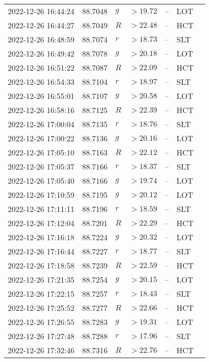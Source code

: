 \documentclass{nature_plusfigure}
\begin{document}
\begin{supplement}
\begin{center}
\begin{longtable}{lllllll}
2022-12-26 16:44:24 & 88.7048 & $g$ & $>19.72$ & -- & LOT &  \\ 
2022-12-26 16:44:27 & 88.7049 & $R$ & $>22.48$ & -- & HCT &  \\ 
2022-12-26 16:48:59 & 88.7074 & $r$ & $>18.73$ & -- & SLT &  \\ 
2022-12-26 16:49:42 & 88.7078 & $g$ & $>20.18$ & -- & LOT &  \\ 
2022-12-26 16:51:22 & 88.7087 & $R$ & $>22.09$ & -- & HCT &  \\ 
2022-12-26 16:54:33 & 88.7104 & $r$ & $>18.97$ & -- & SLT &  \\ 
2022-12-26 16:55:01 & 88.7107 & $g$ & $>20.58$ & -- & LOT &  \\ 
2022-12-26 16:58:16 & 88.7125 & $R$ & $>22.39$ & -- & HCT &  \\ 
2022-12-26 17:00:04 & 88.7135 & $r$ & $>18.76$ & -- & SLT &  \\ 
2022-12-26 17:00:22 & 88.7136 & $g$ & $>20.16$ & -- & LOT &  \\ 
2022-12-26 17:05:10 & 88.7163 & $R$ & $>22.12$ & -- & HCT &  \\ 
2022-12-26 17:05:37 & 88.7166 & $r$ & $>18.37$ & -- & SLT &  \\ 
2022-12-26 17:05:40 & 88.7166 & $g$ & $>19.74$ & -- & LOT &  \\ 
2022-12-26 17:10:59 & 88.7195 & $g$ & $>20.12$ & -- & LOT &  \\ 
2022-12-26 17:11:11 & 88.7196 & $r$ & $>18.59$ & -- & SLT &  \\ 
2022-12-26 17:12:04 & 88.7201 & $R$ & $>22.29$ & -- & HCT &  \\ 
2022-12-26 17:16:18 & 88.7224 & $g$ & $>20.32$ & -- & LOT &  \\ 
2022-12-26 17:16:44 & 88.7227 & $r$ & $>18.77$ & -- & SLT &  \\ 
2022-12-26 17:18:58 & 88.7239 & $R$ & $>22.59$ & -- & HCT &  \\ 
2022-12-26 17:21:35 & 88.7254 & $g$ & $>20.15$ & -- & LOT &  \\ 
2022-12-26 17:22:15 & 88.7257 & $r$ & $>18.43$ & -- & SLT &  \\ 
2022-12-26 17:25:52 & 88.7277 & $R$ & $>22.66$ & -- & HCT &  \\ 
2022-12-26 17:26:55 & 88.7283 & $g$ & $>19.31$ & -- & LOT &  \\ 
2022-12-26 17:27:48 & 88.7288 & $r$ & $>17.96$ & -- & SLT &  \\ 
2022-12-26 17:32:46 & 88.7316 & $R$ & $>22.76$ & -- & HCT &  \\ 

\end{longtable}
\end{center}
\end{supplement}
\end{document}
